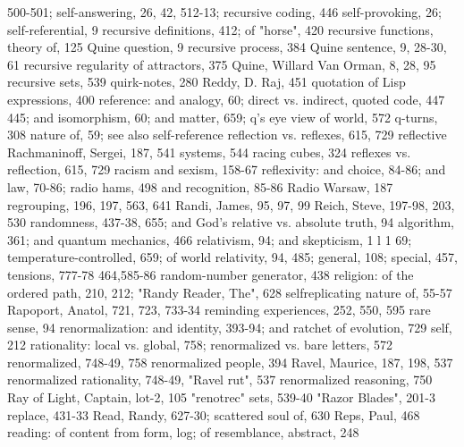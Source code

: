  500-501; self-answering, 26, 42, 512-13;      recursive coding, 446
 self-provoking, 26; self-referential, 9       recursive definitions, 412; of "horse", 420
                                               recursive functions, theory of, 125
Quine question, 9                              recursive process, 384
Quine sentence, 9, 28-30, 61                   recursive regularity of attractors, 375
Quine, Willard Van Orman, 8, 28, 95            recursive sets, 539
quirk-notes, 280                               Reddy, D. Raj, 451
quotation of Lisp expressions, 400             reference: and analogy, 60; direct vs. indirect,
quoted code, 447                                 445; and isomorphism, 60; and matter, 659;
q's eye view of world, 572 q-turns, 308          nature of, 59; see also self-reference
                                               reflection vs. reflexes, 615, 729 reflective
Rachmaninoff, Sergei, 187, 541                   systems, 544
racing cubes, 324                              reflexes vs. reflection, 615, 729
racism and sexism, 158-67                      reflexivity: and choice, 84-86; and law, 70-86;
radio hams, 498                                  and recognition, 85-86
Radio Warsaw, 187                              regrouping, 196, 197, 563, 641
Randi, James, 95, 97, 99                       Reich, Steve, 197-98, 203, 530
randomness, 437-38, 655; and God's             relative vs. absolute truth, 94
 algorithm, 361; and quantum mechanics, 466 relativism, 94; and skepticism, 1 l 1
 69; temperature-controlled, 659; of world     relativity, 94, 485; general, 108; special, 457,
 tensions, 777-78                                464,585-86
random-number generator, 438                   religion: of the ordered path, 210, 212;
"Randy Reader, The", 628                         selfreplicating nature of, 55-57
Rapoport, Anatol, 721, 723, 733-34             reminding experiences, 252, 550, 595
rare sense, 94                                 renormalization: and identity, 393-94; and
ratchet of evolution, 729                        self, 212
rationality: local vs. global, 758;            renormalized vs. bare letters, 572
renormalized, 748-49, 758                      renormalized people, 394
Ravel, Maurice, 187, 198, 537                  renormalized rationality, 748-49,
"Ravel rut", 537                               renormalized reasoning, 750
Ray of Light, Captain, lot-2, 105              "renotrec" sets, 539-40
"Razor Blades", 201-3                          replace, 431-33
Read, Randy, 627-30; scattered soul of, 630    Reps, Paul, 468
reading: of content from form, log; of         resemblance, abstract, 248
